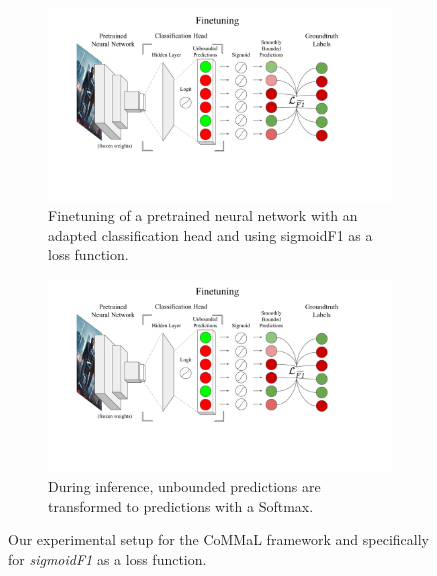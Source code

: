 \begin{figure}[!tp]
\centering
     \begin{subfigure}{0.6\linewidth}
         \centering
         \includegraphics[page=7,width=\linewidth,trim=30 80 110 0,clip]{images/SIGIR2021 Loss Diagram.pdf}
         \caption{Finetuning of a pretrained neural network with an adapted classification head and using sigmoidF1 as a loss function.}
     \end{subfigure}
     \hspace{.02\linewidth}
     \begin{subfigure}{0.36\linewidth}
         \centering
         \includegraphics[page=8,width=\linewidth,trim=190 100 210 0,clip]{images/SIGIR2021 Loss Diagram.pdf}
         \caption{During inference, unbounded predictions are transformed to predictions with a Softmax.}
     \end{subfigure}
     \vspace{.5\baselineskip}
\caption{Our experimental setup for the CoMMaL framework and specifically for \emph{sigmoidF1} as a loss function.}
\label{fig:architecture}
\end{figure}


